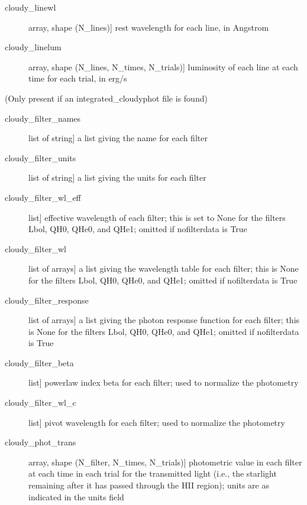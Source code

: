 \documentclass[letterpaper,10pt,english]{sphinxmanual}
\begin{document}
\begin{fulllineitems}
\begin{description}
\begin{description}
\item[{cloudy\_linewl}] \leavevmode{[}array, shape (N\_lines){]}
rest wavelength for each line, in Angstrom

\item[{cloudy\_linelum}] \leavevmode{[}array, shape (N\_lines, N\_times, N\_trials){]}
luminosity of each line at each time for each trial, in erg/s

\end{description}

(Only present if an integrated\_cloudyphot file is found)
\begin{description}
\item[{cloudy\_filter\_names}] \leavevmode{[}list of string{]}
a list giving the name for each filter

\item[{cloudy\_filter\_units}] \leavevmode{[}list of string{]}
a list giving the units for each filter

\item[{cloudy\_filter\_wl\_eff}] \leavevmode{[}list{]}
effective wavelength of each filter; this is set to None for the
filters Lbol, QH0, QHe0, and QHe1; omitted if nofilterdata is
True

\item[{cloudy\_filter\_wl}] \leavevmode{[}list of arrays{]}
a list giving the wavelength table for each filter; this is
None for the filters Lbol, QH0, QHe0, and QHe1; omitted if
nofilterdata is True

\item[{cloudy\_filter\_response}] \leavevmode{[}list of arrays{]}
a list giving the photon response function for each filter;
this is None for the filters Lbol, QH0, QHe0, and QHe1; omitted
if nofilterdata is True

\item[{cloudy\_filter\_beta}] \leavevmode{[}list{]}
powerlaw index beta for each filter; used to normalize the
photometry

\item[{cloudy\_filter\_wl\_c}] \leavevmode{[}list{]}
pivot wavelength for each filter; used to normalize the photometry

\item[{cloudy\_phot\_trans}] \leavevmode{[}array, shape (N\_filter, N\_times, N\_trials){]}
photometric value in each filter at each time in each trial for
the transmitted light (i.e., the starlight remaining after it
has passed through the HII region); units are as indicated in
the units field


\end{description}
\end{description}
\end{fulllineitems}
\end{document}
